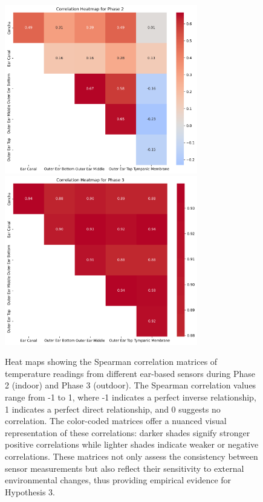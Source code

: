 \begin{figure}[!htbp]
    \centering
    \includegraphics[width=0.75\textwidth]{thesis-doc/images/study1/hypothesis3/Correlation_Heatmap_Phase_2.png}
    \includegraphics[width=0.75\textwidth]{thesis-doc/images/study1/hypothesis3/Correlation_Heatmap_Phase_3.png}
    \caption{Heat maps showing the Spearman correlation matrices of temperature readings from different ear-based sensors during Phase 2 (indoor) and Phase 3 (outdoor). The Spearman correlation values range from -1 to 1, where -1 indicates a perfect inverse relationship, 1 indicates a perfect direct relationship, and 0 suggests no correlation. The color-coded matrices offer a nuanced visual representation of these correlations: darker shades signify stronger positive correlations while lighter shades indicate weaker or negative correlations. These matrices not only assess the consistency between sensor measurements but also reflect their sensitivity to external environmental changes, thus providing empirical evidence for Hypothesis 3.}    
    \label{fig:eval:study1:hypothesis3_result}
\end{figure}

